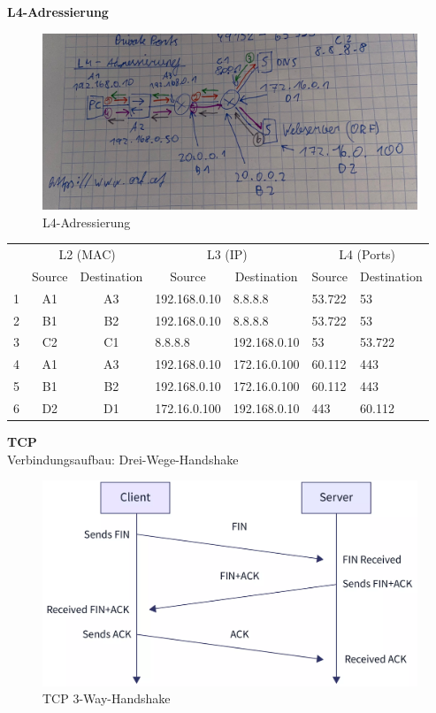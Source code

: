 \textbf{L4-Adressierung}
\begin{figure}[H]
	\centering
	\includegraphics[width=1.0\linewidth]{figures/l4_addr.jpeg}
	\caption{L4-Adressierung}
	\label{fig:l4_addr}
\end{figure}

\begin{table}[H]
	\begin{tabular}{c|ccllll}
		& \multicolumn{2}{c}{L2 (MAC)} & \multicolumn{2}{c}{L3 (IP)} & \multicolumn{2}{c}{L4 (Ports)} \\
		& \multicolumn{1}{c}{Source} & \multicolumn{1}{c}{Destination} & \multicolumn{1}{c}{Source} & \multicolumn{1}{c}{Destination} & \multicolumn{1}{c}{Source} & \multicolumn{1}{c}{Destination} \\
		\hline
		1 & A1 & A3 & 192.168.0.10 & 8.8.8.8 & 53.722 & 53 \\
		2 & B1 & B2 & 192.168.0.10 & 8.8.8.8 & 53.722 & 53 \\
		3 & C2 & C1 & 8.8.8.8 & 192.168.0.10 & 53 & 53.722 \\
		4 & A1 & A3 & 192.168.0.10 & 172.16.0.100 & 60.112 & 443 \\
		5 & B1 & B2 & 192.168.0.10 & 172.16.0.100 & 60.112 & 443 \\
		6 & D2 & D1 & 172.16.0.100 & 192.168.0.10 & 443 & 60.112
	\end{tabular}
\end{table}

\textbf{TCP} \\
Verbindungsaufbau: Drei-Wege-Handshake
\begin{figure}[H]
	\centering
	\includegraphics[width=0.8\linewidth]{figures/tcp_3wh.png}
	\caption{TCP 3-Way-Handshake}
\end{figure}

